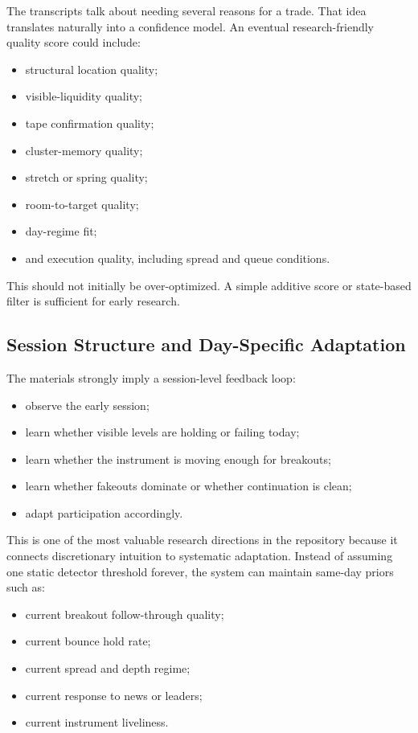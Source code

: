The transcripts talk about needing several reasons for a trade.
That idea translates naturally into a confidence model.
An eventual research-friendly quality score could include:
\begin{itemize}
  \item structural location quality;
  \item visible-liquidity quality;
  \item tape confirmation quality;
  \item cluster-memory quality;
  \item stretch or spring quality;
  \item room-to-target quality;
  \item day-regime fit;
  \item and execution quality, including spread and queue conditions.
\end{itemize}

This should not initially be over-optimized.
A simple additive score or state-based filter is sufficient for early research.

\subsection{Session Structure and Day-Specific Adaptation}

The materials strongly imply a session-level feedback loop:
\begin{itemize}
  \item observe the early session;
  \item learn whether visible levels are holding or failing today;
  \item learn whether the instrument is moving enough for breakouts;
  \item learn whether fakeouts dominate or whether continuation is clean;
  \item adapt participation accordingly.
\end{itemize}

This is one of the most valuable research directions in the repository because it connects discretionary intuition to systematic adaptation.
Instead of assuming one static detector threshold forever, the system can maintain same-day priors such as:
\begin{itemize}
  \item current breakout follow-through quality;
  \item current bounce hold rate;
  \item current spread and depth regime;
  \item current response to news or leaders;
  \item current instrument liveliness.
\end{itemize}


